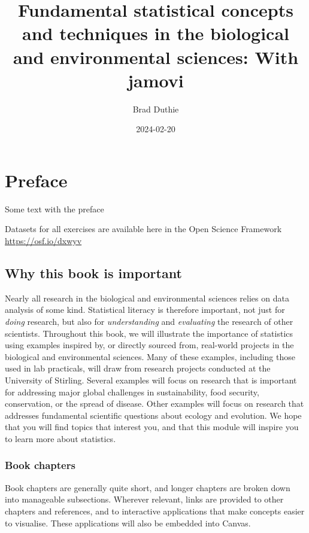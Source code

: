 \documentclass[
]{scrbook}
\title{Fundamental statistical concepts and techniques in the biological and environmental sciences: With jamovi}
\author{Brad Duthie}
\date{2024-02-20}
\begin{document}
\maketitle

{
\hypersetup{linkcolor=}
\setcounter{tocdepth}{1}
\tableofcontents
}
\hypertarget{preface}{%
\chapter*{Preface}\label{preface}}

Some text with the preface

Datasets for all exercises are available here in the Open Science Framework \url{https://osf.io/dxwyv}

\hypertarget{why-this-book-is-important}{%
\section*{Why this book is important}\label{why-this-book-is-important}}

Nearly all research in the biological and environmental sciences relies on data analysis of some kind.
Statistical literacy is therefore important, not just for \emph{doing} research, but also for \emph{understanding} and \emph{evaluating} the research of other scientists.
Throughout this book, we will illustrate the importance of statistics using examples inspired by, or directly sourced from, real-world projects in the biological and environmental sciences.
Many of these examples, including those used in lab practicals, will draw from research projects conducted at the University of Stirling.
Several examples will focus on research that is important for addressing major global challenges in sustainability, food security, conservation, or the spread of disease.
Other examples will focus on research that addresses fundamental scientific questions about ecology and evolution.
We hope that you will find topics that interest you, and that this module will inspire you to learn more about statistics.

\hypertarget{book_chapters}{%
\subsection*{Book chapters}\label{book_chapters}}

Book chapters are generally quite short, and longer chapters are broken down into manageable subsections.
Wherever relevant, links are provided to other chapters and references, and to interactive applications that make concepts easier to visualise.
These applications will also be embedded into Canvas.
\end{document}
